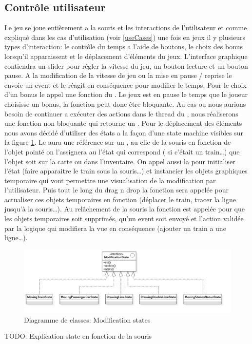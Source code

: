 \documentclass[report, backcover, french, nodocumentinfo]{upmethodology-document}
\begin{document}
			\subsection{Contrôle utilisateur}
				Le jeu se joue entièrement a la souris et les interactions de l'utilisateur et comme expliqué dans les cas d'utilisation (voir \ref{useCases}) une fois en jeux il y plusieurs types d'interaction: le contrôle du temps a l'aide de boutons, le choix des bonus lorsqu'il apparaissent et le déplacement d'éléments du jeux.
					L'interface graphique contiendra un slider pour régler la vitesse du jeu, un bouton lecture et un bouton pause. A la modification de la vitesse de jeu ou la mise en pause / reprise le  envoie un event et le  réagit en conséquence pour modifier le temps.
					Pour le choix d'un bonus le  appel une fonction du . Le jeux est en pause le temps que le joueur choisisse un bonus, la fonction peut donc être bloquante. Au cas ou nous aurions besoin de continuer a exécuter des actions dans le thread du , nous réaliserons une fonction non bloquante qui retourne un .
					Pour le déplacement des éléments nous avons décidé d'utiliser des états a la façon d'une state machine visibles sur la figure \ref{fig:ModificationStatesClassDiagram}. Le  aura une référence sur un , au clic de la souris en fonction de l'objet pointé on l'assignera au l'état qui correspond ( si c'était un train\ldots) que l'objet soit sur la carte ou dans l'inventaire. On appel aussi la  pour initialiser l'état (faire apparaitre le train sous la souris\ldots) et instancier les objets graphiques temporaire qui vont permettre une visualisation de la modification par l'utilisateur. Puis tout le long du drag n drop la fonction  sera appelée pour actualiser ces objets temporaires en fonction (déplacer le train, tracer la ligne jusqu’à la souris\ldots). Au relâchement de la souris la fonction  est appelée pour que les objets temporaires soit supprimés, qu'un event soit envoyé et l'action validée par la logique qui modifiera la vue en conséquence (ajouter un train a une ligne\ldots).
					\begin{figure}[h!]
						\centering
						\includegraphics[width=\textwidth]{figures/ModificationStatesClassDiagram.png}
						\caption{Diagramme de classes: Modification states}
						\label{fig:ModificationStatesClassDiagram}
					\end{figure}
					TODO: Explication state en fonction de la souris
\end{document}

